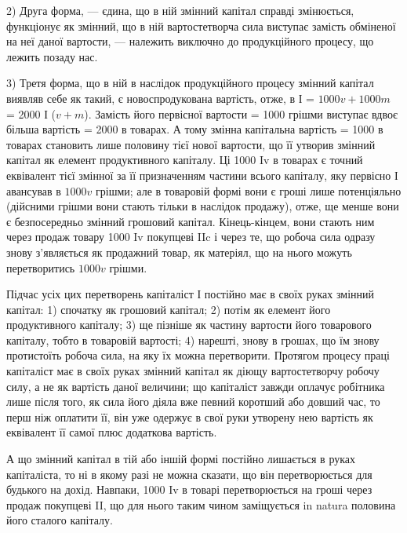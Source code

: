 2) Друга форма, — єдина, що в ній змінний капітал справді змінюється,
функціонує як змінний, що в ній вартостетворча сила виступає замість
обміненої на неї даної вартости, — належить виключно до продукційного
процесу, що лежить позаду нас.

3) Третя форма, що в ній в наслідок продукційного процесу змінний
капітал виявляв себе як такий, є новоспродукована вартість, отже,
в І = $1000 v + 1000 m$ = 2000 І ($v + m$). Замість його первісної вартости =
1000 грішми виступає вдвоє більша вартість = 2000 в товарах.
А тому змінна капітальна вартість = 1000 в товарах становить лише
половину тієї нової вартости, що її утворив змінний капітал як елемент
продуктивного капіталу. Ці 1000 Iv в товарах є точний еквівалент тієї
змінної за її призначенням частини всього капіталу, яку первісно І авансував
в $1000v$ грішми; але в товаровій формі вони є гроші лише потенціяльно
(дійсними грішми вони стають тільки в наслідок продажу), отже,
ще менше вони є безпосередньо змінний грошовий капітал. Кінець-кінцем,
вони стають ним через продаж товару 1000 Iv покупцеві IIc і через
те, що робоча сила одразу знову з’являється як продажний товар, як
матеріял, що на нього можуть перетворитись $1000v$ грішми.

Підчас усіх цих перетворень капіталіст І постійно має в своїх руках
змінний капітал: 1) спочатку як грошовий капітал; 2) потім як елемент
його продуктивного капіталу; 3) ще пізніше як частину вартости його
товарового капіталу, тобто в товаровій вартості; 4) нарешті, знову в грошах,
що їм знову протистоїть робоча сила, на яку їх можна перетворити.
Протягом процесу праці капіталіст має в своїх руках змінний капітал як
діющу вартостетворчу робочу силу, а не як вартість даної величини;
що капіталіст завжди оплачує робітника лише після того, як сила його
діяла вже певний коротший або довший час, то перш ніж оплатити її,
він уже одержує в свої руки утворену нею вартість як еквівалент її
самої плюс додаткова вартість.

А що змінний капітал в тій або іншій формі постійно
лишається в руках капіталіста, то ні в якому
разі не можна сказати, що він перетворюється для будького
на дохід. Навпаки, 1000 Iv в товарі перетворюється на гроші
через продаж покупцеві II, що для нього таким чином заміщується
in natura половина його сталого капіталу.

